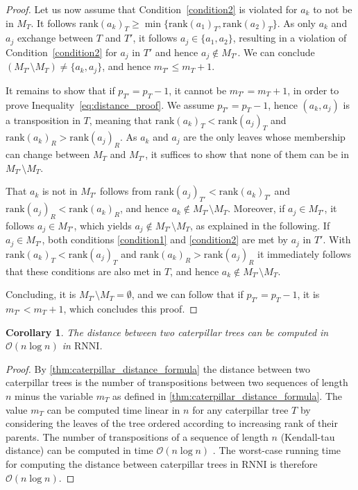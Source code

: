 \documentclass[11pt]{amsart}
\newtheorem{corollary}{Corollary}
\newcommand{\rnni}{\mathrm{RNNI}}
\newcommand{\rank}{\mathrm{rank}}
\renewcommand{\O}{\mathcal O}
\begin{document}
\begin{proof}
	Let us now assume that Condition~\ref{condition2} is violated for $a_k$ to not be in $M_T$.
	It follows $\rank(a_k)_T \geq \min\{\rank(a_1)_T, \rank(a_2)_T\}$.
	As only $a_k$ and $a_j$ exchange between $T$ and $T'$, it follows $a_j \in \{a_1, a_2\}$, resulting in a violation of Condition~\ref{condition2} for $a_j$ in $T'$ and hence $a_j \notin M_{T'}$.
	We can conclude $(M_{T'} \setminus M_T) \neq \{a_k, a_j\}$, and hence $m_{T'} \leq m_T + 1$.

	It remains to show that if $p_{T'} = p_T - 1$, it cannot be $m_{T'} = m_T + 1$, in order to prove Inequality~\ref{eq:distance_proof}.
	We assume $p_{T'} = p_T - 1$, hence $(a_k, a_j)$ is a transposition in $T$, meaning that $\rank(a_k)_T < \rank(a_j)_T$ and $\rank(a_k)_R > \rank(a_j)_R$.
	As $a_k$ and $a_j$ are the only leaves whose membership can change between $M_T$ and $M_{T'}$, it suffices to show that none of them can be in $M_{T'} \setminus M_T$.

	That $a_k$ is not in $M_{T'}$ follows from $\rank(a_j)_{T'} < \rank(a_k)_{T'}$ and $\rank(a_j)_R < \rank(a_k)_R$, and hence $a_k \notin M_{T'} \setminus M_T$.
	Moreover, if $a_j \in M_{T'}$, it follows $a_j \in M_{T'}$, which yields $a_j \notin M_{T'} \setminus M_T$, as explained in the following.
	If $a_j \in M_{T'}$, both conditions \ref{condition1} and \ref{condition2} are met by $a_j$ in $T'$.
	With $\rank(a_k)_T < \rank(a_j)_T$ and $\rank(a_k)_R > \rank(a_j)_R$ it immediately follows that these conditions are also met in $T$, and hence $a_k \notin M_{T'} \setminus M_T$.

	Concluding, it is $M_{T'} \setminus M_T = \emptyset$, and we can follow that if $p_{T'} = p_T - 1$, it is $m_{T'} < m_T + 1$, which concludes this proof.
\end{proof}

\begin{corollary}
	The distance between two caterpillar trees can be computed in $\O(n \log n)$ in $\rnni$.
	\label{cor:caterpillar_distance_rnni_nlogn}
\end{corollary}

\begin{proof}
	By \autoref{thm:caterpillar_distance_formula} the distance between two caterpillar trees is the number of transpositions between two sequences of length $n$ minus the variable $m_T$ as defined in \autoref{thm:caterpillar_distance_formula}.
	The value $m_T$ can be computed time linear in $n$ for any caterpillar tree $T$ by considering the leaves of the tree ordered according to increasing rank of their parents.
	The number of transpositions of a sequence of length $n$ (Kendall-tau distance) can be computed in time $\O(n \log n)$ \autocite{Knight1966-hx}.
	The worst-case running time for computing the distance between caterpillar trees in $\rnni$ is therefore $\O(n \log n)$.
\end{proof}
\end{document}
